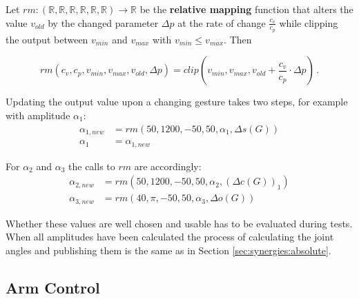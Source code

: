 \begin{defn}
Let $rm : (\mathbb{R}, \mathbb{R}, \mathbb{R}, \mathbb{R}, \mathbb{R}, \mathbb{R}) \rightarrow \mathbb{R}$ be the \textbf{relative mapping} function that alters the value $v_{old}$ by the changed parameter $\Delta p$ at the rate of change $\frac{c_v}{c_p}$ while clipping the output between $v_{min}$ and $v_{max}$ with $v_{min} \leq v_{max}$. Then

\begin{equation}
rm(c_v, c_p, v_{min}, v_{max}, v_{old}, \Delta p) = clip(v_{min}, v_{max}, v_{old} + \frac{c_v}{c_p} \cdot \Delta p) \, .
\end{equation}
\end{defn}

Updating the output value upon a changing gesture takes two steps, for example with amplitude $\alpha_1$:
\begin{align*}
\alpha_{1,new} &= rm(50, 1200, -50, 50, \alpha_1, \Delta s(G)) \\
\alpha_1 &= \alpha_{1,new}
\end{align*}

For $\alpha_2$ and $\alpha_3$ the calls to $rm$ are accordingly:
\begin{align*}
\alpha_{2,new} &= rm(50, 1200, -50, 50, \alpha_2, (\Delta c(G))_1) \\
\alpha_{3,new} &= rm(40, \pi, -50, 50, \alpha_3, \Delta o(G))
\end{align*}

Whether these values are well chosen and usable has to be evaluated during tests. When all amplitudes have been calculated the process of calculating the joint angles and publishing them is the same as in Section \ref{sec:synergies:absolute}.

\subsection{Arm Control}

